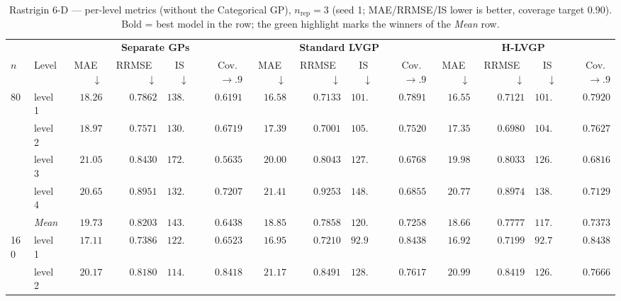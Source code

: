 \begin{table}[htbp]
\centering
\scriptsize
\setlength{\tabcolsep}{2.5pt}
\setlength{\fboxsep}{1pt}
\caption{Rastrigin 6-D --- per-level metrics (without the Categorical GP), $n_{\mathrm{rep}}=3$ (seed 1; MAE/RRMSE/IS lower is better, coverage target $0.90$). Bold = best model in the row; the green highlight marks the winners of the \emph{Mean} row.}
\label{tab:rastrigin_6d_nrep03_nocat}
\begin{tabular}{llrrrrrrrrrrrr}
\toprule
 & & \multicolumn{4}{c}{\textbf{Separate GPs}} & \multicolumn{4}{c}{\textbf{Standard LVGP}} & \multicolumn{4}{c}{\textbf{H-LVGP}} \\
\cmidrule(lr){3-6} \cmidrule(lr){7-10} \cmidrule(lr){11-14}
$n$ & Level & MAE~$\downarrow$ & RRMSE~$\downarrow$ & IS~$\downarrow$ & Cov.~$\to.9$ & MAE~$\downarrow$ & RRMSE~$\downarrow$ & IS~$\downarrow$ & Cov.~$\to.9$ & MAE~$\downarrow$ & RRMSE~$\downarrow$ & IS~$\downarrow$ & Cov.~$\to.9$ \\
\midrule
\multirow{5}{*}{80} & level 1 & $18.26$ & $0.7862$ & $138.5$ & $0.6191$ & $16.58$ & $0.7133$ & $101.9$ & $0.7891$ & {\boldmath$16.55$} & {\boldmath$0.7121$} & {\boldmath$101.5$} & {\boldmath$0.7920$} \\
 & level 2 & $18.97$ & $0.7571$ & $130.0$ & $0.6719$ & $17.39$ & $0.7001$ & $105.7$ & $0.7520$ & {\boldmath$17.35$} & {\boldmath$0.6980$} & {\boldmath$104.5$} & {\boldmath$0.7627$} \\
 & level 3 & $21.05$ & $0.8430$ & $172.8$ & $0.5635$ & $20.00$ & $0.8043$ & $127.6$ & $0.6768$ & {\boldmath$19.98$} & {\boldmath$0.8033$} & {\boldmath$126.5$} & {\boldmath$0.6816$} \\
 & level 4 & {\boldmath$20.65$} & {\boldmath$0.8951$} & {\boldmath$132.5$} & {\boldmath$0.7207$} & $21.41$ & $0.9253$ & $148.2$ & $0.6855$ & $20.77$ & $0.8974$ & $138.4$ & $0.7129$ \\
 & \textit{Mean} & $19.73$ & $0.8203$ & $143.5$ & $0.6438$ & $18.85$ & $0.7858$ & $120.8$ & $0.7258$ & \colorbox{green!20}{\boldmath$18.66$} & \colorbox{green!20}{\boldmath$0.7777$} & \colorbox{green!20}{\boldmath$117.7$} & \colorbox{green!20}{\boldmath$0.7373$} \\
\midrule
\multirow{5}{*}{160} & level 1 & $17.11$ & $0.7386$ & $122.9$ & $0.6523$ & $16.95$ & $0.7210$ & $92.94$ & {\boldmath$0.8438$} & {\boldmath$16.92$} & {\boldmath$0.7199$} & {\boldmath$92.73$} & $0.8438$ \\
 & level 2 & {\boldmath$20.17$} & {\boldmath$0.8180$} & {\boldmath$114.8$} & {\boldmath$0.8418$} & $21.17$ & $0.8491$ & $128.7$ & $0.7617$ & $20.99$ & $0.8419$ & $126.3$ & $0.7666$ \\

\end{tabular}
\end{table}

